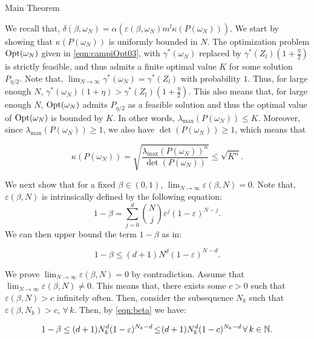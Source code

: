 \begin{subsection}{Main Theorem}
\begin{pf}
We recall that, $\delta(\beta, \omega_N) = \alpha \left( \varepsilon(\beta, \omega_N) m^l \kappa(P(\omega_N)) \right)$. We start by showing that $\kappa \left( P(\omega_N) \right)$  is uniformly bounded in $N$. The optimization problem $\text{Opt}(\omega_N)$ given in \eqref{eqn:campiOpt03}, with $\gamma^{*}(\omega_N)$ replaced by $\gamma^{*}(Z_l)(1+\frac{\eta}{2})$ is strictly feasible, and thus admits a finite optimal value $K$ for some solution $P_{\eta/2}$. Note that, $\lim_{N \to \infty} \gamma^{*}(\omega_N)= \gamma^{*}(Z_l)$ with probability $1$. Thus, for large enough $N$, \mbox{$\gamma^{*}(\omega_N)(1+\eta) > \gamma^{*}(Z_l)(1+\frac{\eta}{2})$.} This also means that, for large enough $N$, $\text{Opt}(\omega_N)$ admits $P_{\eta/2}$ as a feasible solution and thus the optimal value of $\text{Opt}(\omega_N)$ is bounded by $K.$ In other words, \mbox{$\lambda_{\max}(P({\omega_N})) \leq K$.} Moreover, since  
$\lambda_{\max}(P(\omega_N))\geq 1$, we also have \mbox{$\det(P(\omega_N)) \geq 1$,} which means that

\begin{equation}\label{kappa}
\kappa \left( P(\omega_N) \right) = \sqrt{\frac{\lambda_{\max}(P(\omega_N))^n}{\det(P(\omega_N))}} \leq \sqrt{K^n}.
\end{equation}

We next show that for a fixed $\beta \in (0,1)$, $\lim_{N \to \infty} \varepsilon(\beta, N) = 0$. Note that, $\varepsilon(\beta, N)$ is intrinsically defined by the following equation:
$$1-\beta = \sum_{j=0}^d {{N}\choose{j}} \varepsilon^j (1-\varepsilon)^{N-j}.$$
We can then upper bound the term $1-\beta$ as in:

\begin{equation}\label{eqn:beta}
1-\beta \leq  (d+1)N^d (1-\varepsilon)^{N-d}.
\end{equation}

We prove $\lim_{N \to \infty} \varepsilon(\beta, N) = 0$ by contradiction. Assume that $\lim_{N \to \infty} \varepsilon(\beta, N) \not= 0$. This means that, there exists some $c > 0$ such that $\varepsilon(\beta, N) > c$ infinitely often. Then, consider the subsequence $N_k$ such that $\varepsilon(\beta, N_k) > c$, $\forall\, k.$ Then, by \eqref{eqn:beta} we have:

\begin{equation*}
1-\beta \leq  (d+1)N_k^d (1-\varepsilon)^{N_k-d}\hspace{-0.4mm} \leq \hspace{-0.7mm}(d+1)N_k^d (1-c)^{N_k-d}\, \forall\,k \in \mathbb{N}. 
\end{equation*}


\end{pf}
\end{subsection}
